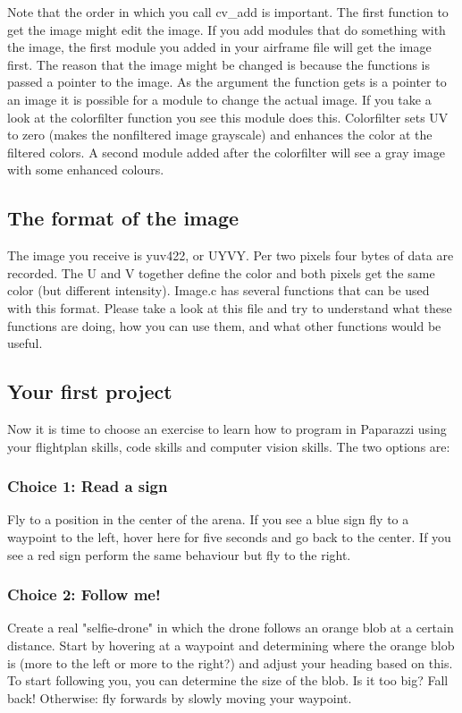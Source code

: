 \documentclass{article}
\begin{document}
Note that the order in which you call cv\_add is important. The first function to get the image might edit the image. If you add modules that do something with the image, the first module you added in your airframe file will get the image first. The reason that the image might be changed is because the functions is passed a pointer to the image. 
As the argument the function gets is a pointer to an image it is possible for a module to change the actual image. If you take a look at the colorfilter function you see this module does this. Colorfilter sets UV to zero (makes the nonfiltered image grayscale) and enhances the color at the filtered colors. A second module added after the colorfilter will see a gray image with some enhanced colours. 

\subsection*{The format of the image}
The image you receive is yuv422, or UYVY. Per two pixels four bytes of data are recorded. The U and V together define the color and both pixels get the same color (but different intensity). Image.c has several functions that can be used with this format. Please take a look at this file and try to understand what these functions are doing, how you can use them, and what other functions would be useful. 

\subsection*{Your first project}
Now it is time to choose an exercise to learn how to program in Paparazzi using your flightplan skills, code skills and computer vision skills. The two options are:

\subsubsection*{Choice 1: Read a sign}
Fly to a position in the center of the arena. If you see a blue sign fly to a waypoint to the left, hover here for five seconds and go back to the center. If you see a red sign perform the same behaviour but fly to the right. 

\subsubsection*{Choice 2: Follow me!}
Create a real "selfie-drone" in which the drone follows an orange blob at a certain distance. 
Start by hovering at a waypoint and determining where the orange blob is (more to the left or more to the right?) and adjust your heading based on this. 
To start following you, you can determine the size of the blob. Is it too big? Fall back! Otherwise: fly forwards by slowly moving your waypoint.
\end{document}
